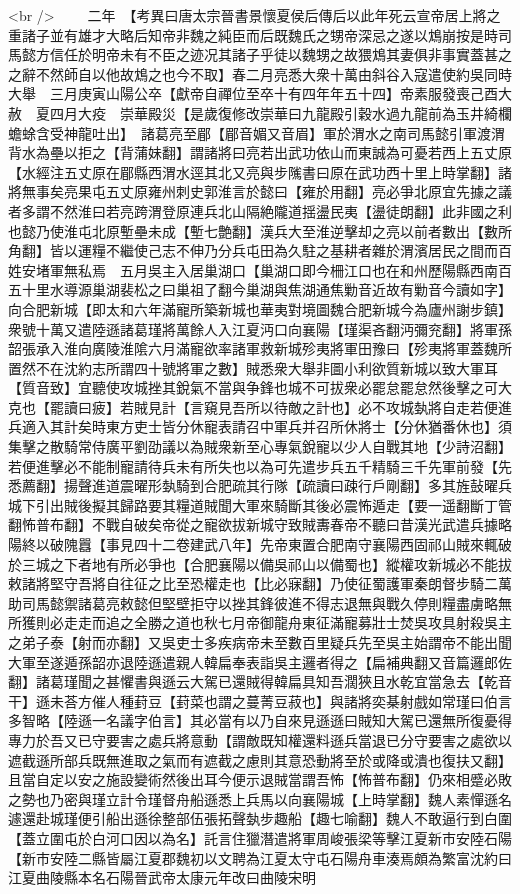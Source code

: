 <br />
　　二年　【考異曰唐太宗晉書景懷夏侯后傳后以此年死云宣帝居上將之重諸子並有雄才大略后知帝非魏之純臣而后既魏氏之甥帝深忌之遂以鴆崩按是時司馬懿方信任於明帝未有不臣之迹况其諸子乎徒以魏甥之故猥鴆其妻俱非事實蓋甚之之辭不然師自以他故鴆之也今不取】春二月亮悉大衆十萬由斜谷入寇遣使約吳同時大舉　三月庚寅山陽公卒【獻帝自禪位至卒十有四年年五十四】帝素服發喪己酉大赦　夏四月大疫　崇華殿災【是歲復修改崇華曰九龍殿引穀水過九龍前為玉井綺欄蟾蜍含受神龍吐出】　諸葛亮至郿【郿音媚又音眉】軍於渭水之南司馬懿引軍渡渭背水為壘以拒之【背蒲妹翻】謂諸將曰亮若出武功依山而東誠為可憂若西上五丈原【水經注五丈原在郿縣西渭水逕其北又亮與步隲書曰原在武功西十里上時掌翻】諸將無事矣亮果屯五丈原雍州刺史郭淮言於懿曰【雍於用翻】亮必爭北原宜先據之議者多謂不然淮曰若亮跨渭登原連兵北山隔絶隴道揺盪民夷【盪徒朗翻】此非國之利也懿乃使淮屯北原塹壘未成【塹七艶翻】漢兵大至淮逆擊却之亮以前者數出【數所角翻】皆以運糧不繼使己志不伸乃分兵屯田為久駐之基耕者雜於渭濱居民之間而百姓安堵軍無私焉　五月吳主入居巢湖口【巢湖口即今柵江口也在和州歷陽縣西南百五十里水導源巢湖裴松之曰巢祖了翻今巢湖與焦湖通焦勦音近故有勦音今讀如字】向合肥新城【即太和六年滿寵所築新城也華夷對境圖魏合肥新城今為廬州謝步鎮】衆號十萬又遣陸遜諸葛瑾將萬餘人入江夏沔口向襄陽【瑾渠吝翻沔彌兖翻】將軍孫韶張承入淮向廣陵淮隂六月滿寵欲率諸軍救新城殄夷將軍田豫曰【殄夷將軍蓋魏所置然不在沈約志所謂四十號將軍之數】賊悉衆大舉非圖小利欲質新城以致大軍耳【質音致】宜聽使攻城挫其銳氣不當與争鋒也城不可拔衆必罷怠罷怠然後擊之可大克也【罷讀曰疲】若賊見計【言窺見吾所以待敵之計也】必不攻城埶將自走若便進兵適入其計矣時東方吏士皆分休寵表請召中軍兵并召所休將士【分休猶番休也】須集擊之散騎常侍廣平劉劭議以為賊衆新至心專氣銳寵以少人自戰其地【少詩沼翻】若便進擊必不能制寵請待兵未有所失也以為可先遣步兵五千精騎三千先軍前發【先悉薦翻】揚聲進道震曜形埶騎到合肥疏其行隊【疏讀曰疎行戶剛翻】多其旌鼔曜兵城下引出賊後擬其歸路要其糧道賊聞大軍來騎斷其後必震怖遁走【要一遥翻斷丁管翻怖普布翻】不戰自破矣帝從之寵欲拔新城守致賊夀春帝不聽曰昔漢光武遣兵據略陽終以破隗囂【事見四十二卷建武八年】先帝東置合肥南守襄陽西固祁山賊來輒破於三城之下者地有所必爭也【合肥襄陽以備吳祁山以備蜀也】縱權攻新城必不能拔敕諸將堅守吾將自往征之比至恐權走也【比必寐翻】乃使征蜀護軍秦朗督步騎二萬助司馬懿禦諸葛亮敕懿但堅壁拒守以挫其鋒彼進不得志退無與戰久停則糧盡虜略無所獲則必走走而追之全勝之道也秋七月帝御龍舟東征滿寵募壯士焚吳攻具射殺吳主之弟子泰【射而亦翻】又吳吏士多疾病帝未至數百里疑兵先至吳主始謂帝不能出聞大軍至遂遁孫韶亦退陸遜遣親人韓扁奉表詣吳主邏者得之【扁補典翻又音篇邏郎佐翻】諸葛瑾聞之甚懼書與遜云大駕已還賊得韓扁具知吾濶狹且水乾宜當急去【乾音干】遜未荅方催人種葑豆【葑菜也謂之蔓菁豆菽也】與諸將奕棊射戲如常瑾曰伯言多智略【陸遜一名議字伯言】其必當有以乃自來見遜遜曰賊知大駕已還無所復憂得專力於吾又已守要害之處兵將意動【謂敵既知權還料遜兵當退已分守要害之處欲以遮截遜所部兵既無進取之氣而有遮截之慮則其意恐動將至於或降或潰也復扶又翻】且當自定以安之施設變術然後出耳今便示退賊當謂吾怖【怖普布翻】仍來相蹙必敗之勢也乃密與瑾立計令瑾督舟船遜悉上兵馬以向襄陽城【上時掌翻】魏人素憚遜名遽還赴城瑾便引船出遜徐整部伍張拓聲埶步趣船【趣七喻翻】魏人不敢逼行到白圍【蓋立圍屯於白河口因以為名】託言住獵潛遣將軍周峻張梁等擊江夏新市安陸石陽【新市安陸二縣皆屬江夏郡魏初以文聘為江夏太守屯石陽舟車湊焉頗為繁富沈約曰江夏曲陵縣本名石陽晉武帝太康元年改曰曲陵宋明